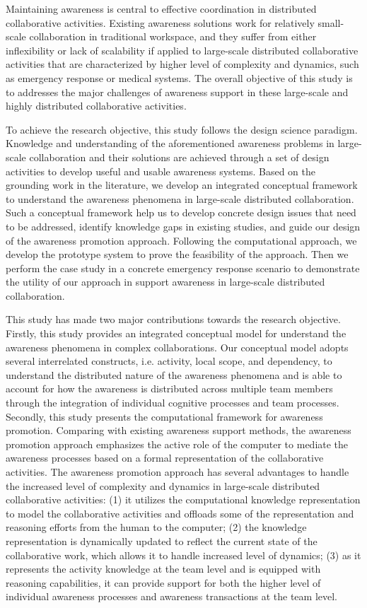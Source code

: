 Maintaining awareness is central to effective coordination in distributed collaborative activities. Existing awareness solutions work for relatively small-scale collaboration in traditional workspace, and they suffer from either inflexibility or lack of scalability if applied to large-scale distributed collaborative activities that are characterized by higher level of complexity and dynamics, such as emergency response or medical systems. The overall objective of this study is to addresses the major challenges of awareness support in these large-scale and highly distributed collaborative activities.

To achieve the research objective, this study follows the design science paradigm. Knowledge and understanding of the aforementioned awareness problems in large-scale collaboration and their solutions are achieved through a set of design activities to develop useful and usable awareness systems. Based on the grounding work in the literature, we develop an integrated conceptual framework to understand the awareness phenomena in large-scale distributed collaboration. Such a conceptual framework help us to develop concrete design issues that need to be addressed, identify knowledge gaps in existing studies, and guide our design of the awareness promotion approach. Following the computational approach, we develop the prototype system to prove the feasibility of the approach. Then we perform the case study in a concrete emergency response scenario to demonstrate the utility of our approach in support awareness in large-scale distributed collaboration.

This study has made two major contributions towards the research objective. Firstly, this study provides an integrated conceptual model for understand the awareness phenomena in complex collaborations. Our conceptual model adopts several interrelated constructs, i.e. activity, local scope, and dependency, to understand the distributed nature of the awareness phenomena and is able to account for how the awareness is distributed across multiple team members through the integration of individual cognitive processes and team processes. Secondly, this study presents the computational framework for awareness promotion. Comparing with existing awareness support methods, the awareness promotion approach emphasizes the active role of the computer to mediate the awareness processes based on a formal representation of the collaborative activities. The awareness promotion approach has several advantages to handle the increased level of complexity and dynamics in large-scale distributed collaborative activities: (1) it utilizes the computational knowledge representation to model the collaborative activities and offloads some of the representation and reasoning efforts from the human to the computer; (2) the knowledge representation is dynamically updated to reflect the current state of the collaborative work, which allows it to handle increased level of dynamics; (3) as it represents the activity knowledge at the team level and is equipped with reasoning capabilities, it can provide support for both the higher level of individual awareness processes and awareness transactions at the team level.
